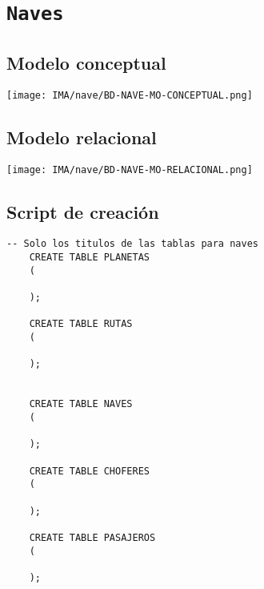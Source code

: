 \section{\texttt{Naves}}

  
\subsection{Modelo conceptual}
\begin{center}
    \texttt{[image: IMA/nave/BD-NAVE-MO-CONCEPTUAL.png]}
\end{center}


\subsection{Modelo relacional}
\begin{center}
  \texttt{[image: IMA/nave/BD-NAVE-MO-RELACIONAL.png]}
\end{center}


\subsection{Script de creación}
\begin{lstlisting}[caption={Tablas para la BdDatos}, label={lst:sql_estadios}]
    -- Solo los titulos de las tablas para naves    
    CREATE TABLE PLANETAS
    (
      
    );
    
    CREATE TABLE RUTAS
    (

    );
    
    
    CREATE TABLE NAVES
    (
      
    );
    
    CREATE TABLE CHOFERES
    (
      
    );
    
    CREATE TABLE PASAJEROS
    (

    );
\end{lstlisting}

